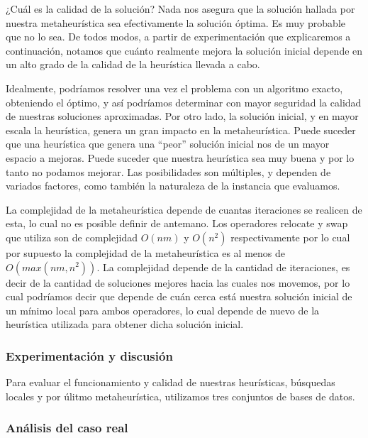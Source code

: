 \documentclass[
]{article}
\begin{document}
¿Cuál es la calidad de la solución? Nada nos asegura que la solución
hallada por nuestra metaheurística sea efectivamente la solución óptima.
Es muy probable que no lo sea. De todos modos, a partir de
experimentación que explicaremos a continuación, notamos que cuánto
realmente mejora la solución inicial depende en un alto grado de la
calidad de la heurística llevada a cabo.

Idealmente, podríamos resolver una vez el problema con un algoritmo
exacto, obteniendo el óptimo, y así podríamos determinar con mayor
seguridad la calidad de nuestras soluciones aproximadas. Por otro lado,
la solución inicial, y en mayor escala la heurística, genera un gran
impacto en la metaheurística. Puede suceder que una heurística que
genera una ``peor'' solución inicial nos de un mayor espacio a mejoras.
Puede suceder que nuestra heurística sea muy buena y por lo tanto no
podamos mejorar. Las posibilidades son múltiples, y dependen de variados
factores, como también la naturaleza de la instancia que evaluamos.

La complejidad de la metaheurística depende de cuantas iteraciones se
realicen de esta, lo cual no es posible definir de antemano. Los
operadores relocate y swap que utiliza son de complejidad \(O(nm)\) y
\(O(n^2)\) respectivamente por lo cual por supuesto la complejidad de la
metaheurística es al menos de \(O(max(nm, n^2))\). La complejidad
depende de la cantidad de iteraciones, es decir de la cantidad de
soluciones mejores hacia las cuales nos movemos, por lo cual podríamos
decir que depende de cuán cerca está nuestra solución inicial de un
mínimo local para ambos operadores, lo cual depende de nuevo de la
heurística utilizada para obtener dicha solución inicial.

\hypertarget{experimentaciuxf3n-y-discusiuxf3n}{%
\subsubsection{Experimentación y
discusión}\label{experimentaciuxf3n-y-discusiuxf3n}}

Para evaluar el funcionamiento y calidad de nuestras heurísticas,
búsquedas locales y por úlitmo metaheurística, utilizamos tres conjuntos
de bases de datos.

\hypertarget{anuxe1lisis-del-caso-real}{%
\subsubsection{Análisis del caso real}\label{anuxe1lisis-del-caso-real}}
\end{document}
